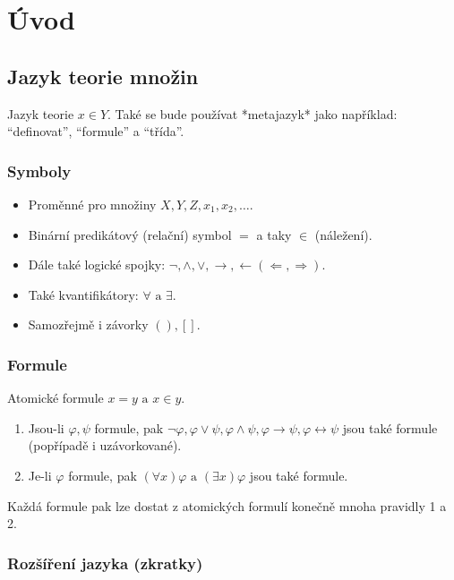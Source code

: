 \chapter{Úvod}

\section{Jazyk teorie množin}

Jazyk teorie $x \in Y$. Také se bude používat *metajazyk* jako například: “definovat”, “formule” a “třída”.

\subsection{Symboly}

\begin{itemize}
	\item Proměnné pro množiny $X,Y,Z,x_{1},x_{2}, \dots$.
	\item Binární predikátový (relační) symbol $=$ a taky $\in$ (náležení).
	\item Dále také logické spojky: $\neg ,\land ,\lor ,\rightarrow , \leftarrow (\Leftarrow , \Rightarrow)$.
	\item Také kvantifikátory: $\forall \text{ a } \exists$.
	\item Samozřejmě i závorky $(), []$.
\end{itemize}

\subsection{Formule}

Atomické formule $x = y \text{ a } x \in y$.

\begin{enumerate}
	\item Jsou-li $\varphi, \psi$ formule, pak $\neg \varphi , \varphi \lor \psi , \varphi \land \psi , \varphi \rightarrow \psi , \varphi \leftrightarrow \psi$ jsou také formule (popřípadě i uzávorkované).
	\item Je-li $\varphi$ formule, pak $(\forall x) \varphi \text{ a } (\exists x)\varphi$ jsou také formule.
\end{enumerate}

Každá formule pak lze dostat z atomických formulí konečně mnoha pravidly 1 a 2.

\subsection{Rozšíření jazyka (zkratky)}

